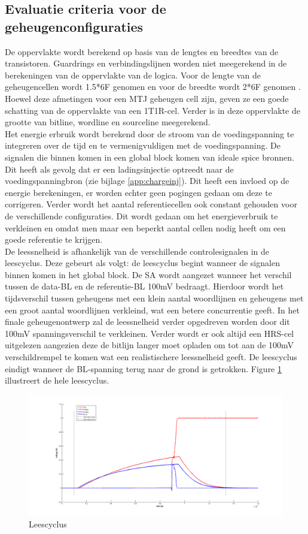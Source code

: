 \subsection{Evaluatie criteria voor de geheugenconfiguraties}
De oppervlakte wordt berekend op basis van de lengtes en breedtes van de transistoren. Guardrings en verbindingslijnen worden niet meegerekend in de berekeningen van de oppervlakte van de logica. Voor de lengte van de geheugencellen wordt 1.5*6F genomen en voor de breedte wordt 2*6F genomen \cite{ppt:cosemans}. Hoewel deze afmetingen voor een MTJ geheugen cell zijn, geven ze een goede schatting van de oppervlakte van een 1T1R-cel. Verder is in deze oppervlakte de grootte van bitline, wordline en sourceline meegerekend. \\
Het energie erbruik wordt berekend door de stroom van de voedingspanning te integreren over de tijd en te vermenigvuldigen met de voedingspanning. De signalen die binnen komen in een global block komen van ideale spice bronnen. Dit heeft als gevolg dat er een ladingsinjectie optreedt naar de voedingspanningbron (zie bijlage \ref{app:chargeinj}). Dit heeft een invloed op de energie berekeningen, er worden echter geen pogingen gedaan om deze te corrigeren. Verder wordt het aantal referentiecellen ook constant gehouden voor de verschillende configuraties. Dit wordt gedaan om het energieverbruik te verkleinen en omdat men maar een beperkt aantal cellen nodig heeft om een goede referentie te krijgen.\\
De leessnelheid is afhankelijk van de verschillende controlesignalen in de leescyclus. Deze gebeurt als volgt: de leescyclus begint wanneer de signalen binnen komen in het global block. De SA wordt aangezet wanneer het verschil tussen de data-BL en de referentie-BL 100mV bedraagt. Hierdoor wordt het tijdsverschil tussen geheugens met een klein aantal woordlijnen en geheugens met een groot aantal woordlijnen verkleind, wat een betere concurrentie geeft. In het finale geheugenontwerp zal de leessnelheid verder opgedreven worden door dit 100mV spanningsverschil te verkleinen. Verder wordt er ook altijd een HRS-cel uitgelezen aangezien deze de bitlijn langer moet opladen om tot aan de 100mV verschildrempel te komen wat een realistischere leessnelheid geeft. De leescyclus eindigt wanneer de BL-spanning terug naar de grond is getrokken. Figure \ref{fig:leescyclus} illustreert de hele leescyclus.

\begin{figure}[!ht]
  \centering
  \includegraphics[scale=0.6]{../fig/hfdstk-timing-leescyclus.png}
  \caption[Leescyclus]{Leescyclus}
  \label{fig:leescyclus}
\end{figure} 

